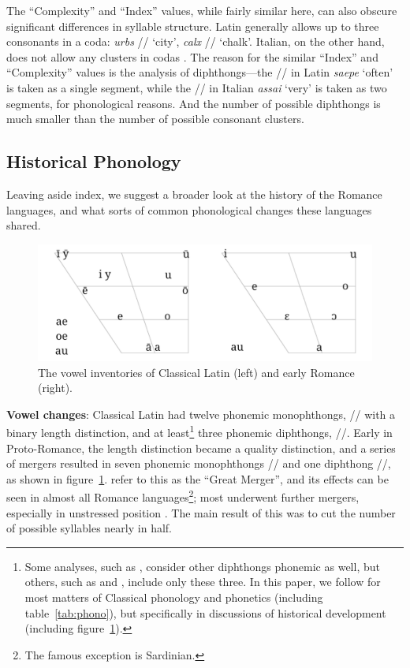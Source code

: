 \documentclass[12pt,twoside]{article}
\newcommand{\ipa}[1]{/\textipa{#1}/}
\begin{document}
The ``Complexity'' and ``Index'' values, while fairly similar here, can also obscure significant differences in syllable structure. Latin generally allows up to three consonants in a coda: \emph{urbs} \ipa{urps} `city', \emph{calx} \ipa{kalks} `chalk'. Italian, on the other hand, does not allow any clusters in codas \citep{hall}. The reason for the similar ``Index'' and ``Complexity'' values is the analysis of diphthongs---the \ipa{a\textsubarch{e}} in Latin \emph{saepe} `often' is taken as a single segment, while the \ipa{a\textsubarch{i}} in Italian \emph{assai} `very' is taken as two segments, for phonological reasons. And the number of possible diphthongs is much smaller than the number of possible consonant clusters.

\subsection{Historical Phonology}

Leaving aside  index, we suggest a broader look at the history of the Romance languages, and what sorts of common phonological changes these languages shared.

\begin{figure}[h]
\centering
\caption{The vowel inventories of Classical Latin (left) and early Romance (right).}
\label{fig:vowels}
\noindent\includegraphics[width=\linewidth]{vowelchange}
\end{figure}

\textbf{Vowel changes}: Classical Latin had twelve phonemic monophthongs, \ipa{i y e a o u} with a binary length distinction, and at least\footnote{Some analyses, such as \citet{allen}, consider other diphthongs phonemic as well, but others, such as \citet{alkire} and \citet{boyd}, include only these three. In this paper, we follow \citeauthor{allen} for most matters of Classical phonology and phonetics (including table~\ref{tab:phono}), but \citet{alkire} specifically in discussions of historical development (including figure~\ref{fig:vowels}).} three phonemic diphthongs, \ipa{a\textsubarch{e} o\textsubarch{e} a\textsubarch{u}}. Early in Proto-Romance, the length distinction became a quality distinction, and a series of mergers resulted in seven phonemic monophthongs \ipa{i e E a O o u} and one diphthong \ipa{a\textsubarch{u}}, as shown in figure~\ref{fig:vowels}. \citet{alkire} refer to this as the ``Great Merger'', and its effects can be seen in almost all Romance languages\footnote{The famous exception is Sardinian.}; most underwent further mergers, especially in unstressed position \citep{alkire,boyd}. The main result of this was to cut the number of possible syllables nearly in half.
\end{document}

